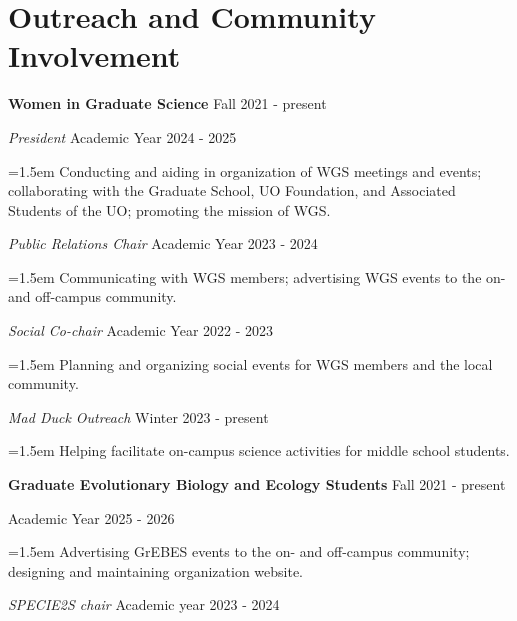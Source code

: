 \documentclass[11pt]{extarticle}
\newcommand{\NewPart}[1]{\section*{{#1}}}
\begin{document}
\NewPart{Outreach and Community Involvement}

\noindent \textbf{Women in Graduate Science}  \hfill Fall 2021 - present \par
\vspace{1mm}
\textit{President} \hfill Academic Year 2024 - 2025 \par
{\narrower \hangindent=1.5em {Conducting and aiding in organization of WGS meetings and events;
                                          collaborating with the Graduate School, UO Foundation, and Associated Students of the UO;
                                          promoting the mission of WGS.} \normalsize \par }
\vspace{1mm}
\textit{Public Relations Chair} \hfill Academic Year 2023 - 2024 \par
{\narrower \hangindent=1.5em {Communicating with WGS members; 
                                        advertising WGS events to the on- and off-campus community.} \normalsize \par }
\vspace{1mm}
\textit{Social Co-chair} \hfill Academic Year 2022 - 2023 \par
{\narrower \hangindent=1.5em {Planning and organizing social events for WGS members and the local community.} \normalsize \par }
\vspace{1mm}
\textit{Mad Duck Outreach} \hfill Winter 2023 - present \par
{\narrower \hangindent=1.5em {Helping facilitate on-campus science activities for middle school students.} \normalsize \par }
\vspace{2.5mm}
\noindent \textbf{Graduate Evolutionary Biology and Ecology Students} \hfill Fall 2021 - present \par
\vspace{1mm}
\vspace{Public Relations & Website Organizer} \hfill Academic Year 2025 - 2026 \par
{\narrower \hangindent=1.5em {Advertising GrEBES events to the on- and off-campus community;
                                          designing and maintaining organization website.} \normalsize \par }
\vspace{1mm}
\textit{SPECIE2S chair} \hfill Academic year 2023 - 2024 \par
\end{document}
